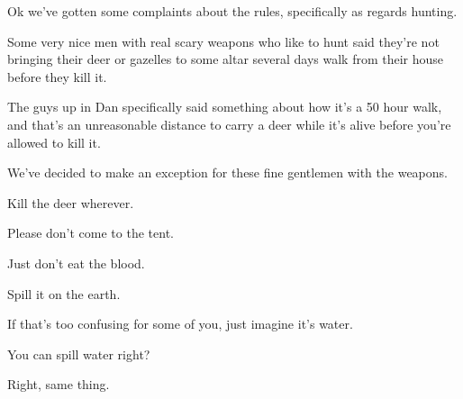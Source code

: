 {
}
{
}
{
	Ok we've gotten some complaints about the rules, specifically as regards
	hunting.

	Some very nice men with real scary weapons who like to hunt said they're not
	bringing their deer or gazelles to some altar several days walk from their
	house before they kill it.

	The guys up in Dan specifically said something about how it's a 50 hour walk,
	and that's an unreasonable distance to carry a deer while it's alive before
	you're allowed to kill it.

	We've decided to make an exception for these fine gentlemen with the weapons.

	Kill the deer wherever.

	Please don't come to the tent.

}

{
}
{
}
{
	Just don't eat the blood.

	Spill it on the earth.

	If that's too confusing for some of you, just imagine it's water.

	You can spill water right?

	Right, same thing.
}

